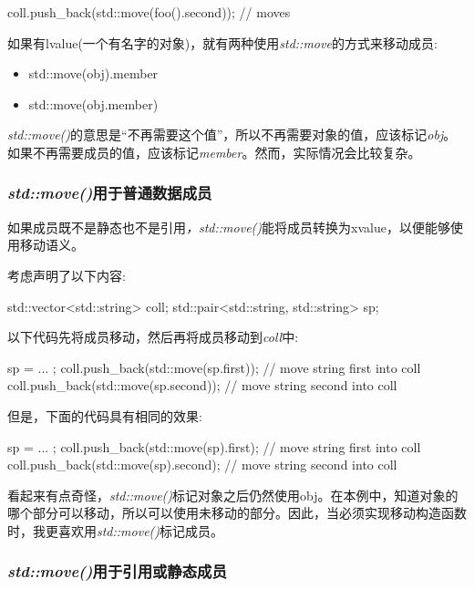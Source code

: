 \begin{cppcode}
coll.push_back(std::move(foo().second)); // moves
\end{cppcode}

如果有lvalue(一个有名字的对象)，就有两种使用\textit{std::move}的方式来移动成员:

\begin{itemize}
	\item std::move(obj).member
	\item std::move(obj.member)
\end{itemize}

\textit{std::move()}的意思是“不再需要这个值”，所以不再需要对象的值，应该标记\textit{obj}。如果不再需要成员的值，应该标记\textit{member}。然而，实际情况会比较复杂。

\subsubsection{\textit{std::move()}用于普通数据成员}

如果成员既不是静态也不是引用\textit{，std::move()}能将成员转换为xvalue，以便能够使用移动语义。

考虑声明了以下内容:

\begin{cppcode}
std::vector<std::string> coll;
std::pair<std::string, std::string> sp;
\end{cppcode}

以下代码先将成员移动，然后再将成员移动到\textit{coll}中:

\begin{cppcode}
sp = ... ;
coll.push_back(std::move(sp.first)); // move string first into coll
coll.push_back(std::move(sp.second)); // move string second into coll
\end{cppcode}

但是，下面的代码具有相同的效果:

\begin{cppcode}
sp = ... ;
coll.push_back(std::move(sp).first); // move string first into coll
coll.push_back(std::move(sp).second); // move string second into coll
\end{cppcode}

看起来有点奇怪，\textit{std::move()}标记对象之后仍然使用obj。在本例中，知道对象的哪个部分可以移动，所以可以使用未移动的部分。因此，当必须实现移动构造函数时，我更喜欢用\textit{std::move()}标记成员。

\subsubsection{\textit{std::move()}用于引用或静态成员}

